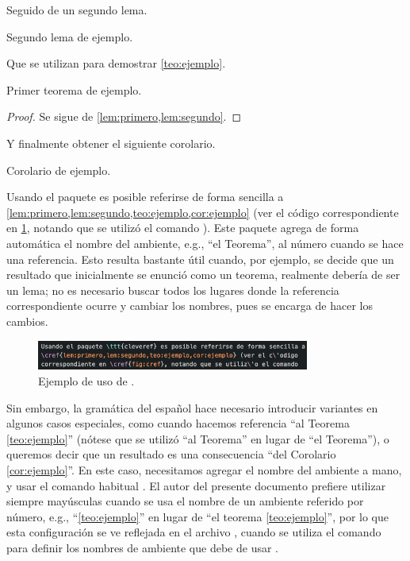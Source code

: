 Seguido de un segundo lema.

\begin{lema}
\label{lem:segundo}
Segundo lema de ejemplo.
\end{lema}

Que se utilizan para demostrar \cref{teo:ejemplo}.

\begin{teorema}
\label{teo:ejemplo}
Primer teorema de ejemplo.
\end{teorema}

\begin{proof}
Se sigue de \cref{lem:primero,lem:segundo}.
\end{proof}

Y finalmente obtener el siguiente corolario.

\begin{corolario}
\label{cor:ejemplo}
Corolario de ejemplo.
\end{corolario}

Usando el paquete \href{http://tug.ctan.org/tex-archive/macros/latex/contrib/%
cleveref/cleveref.pdf}{} es posible referirse de
forma sencilla a \cref{lem:primero,lem:segundo,teo:ejemplo,cor:ejemplo} (ver el
c\'odigo correspondiente en \cref{fig:cref}, notando que se utiliz\'o el comando
).   Este paquete agrega de forma autom\'atica el
nombre del ambiente, e.g., ``el Teorema'', al n\'umero cuando se hace una
referencia.   Esto resulta bastante \'util cuando, por ejemplo, se decide que un
resultado que inicialmente se enunci\'o como un teorema, realmente deber\'ia de
ser un lema; no es necesario buscar todos los lugares donde la referencia
correspondiente ocurre y cambiar los nombres, pues  se encarga de
hacer los cambios.

\begin{figure}[H]
  \centering
  \includegraphics[width=0.8\textwidth]{recursos/capturas/cref}
  \caption{Ejemplo de uso de .}
  \label{fig:cref}
\end{figure}

Sin embargo, la gram\'atica del espa\~nol hace necesario introducir variantes en
algunos casos especiales, como cuando hacemos referencia ``al Teorema
\ref{teo:ejemplo}'' (n\'otese que se utiliz\'o ``al Teorema'' en lugar de ``el
Teorema''), o queremos decir que un resultado es una consecuencia ``del
Corolario \ref{cor:ejemplo}''.   En este caso, necesitamos agregar el nombre del
ambiente a mano, y usar el comando habitual .   El
autor del presente documento prefiere utilizar siempre may\'usculas cuando se
usa el nombre de un ambiente referido por n\'umero, e.g., ``\cref{teo:ejemplo}''
en lugar de ``el teorema \ref{teo:ejemplo}'', por lo que esta configuraci\'on se
ve reflejada en el archivo , cuando se utiliza el comando
 para definir los nombres de ambiente que debe de
usar .

